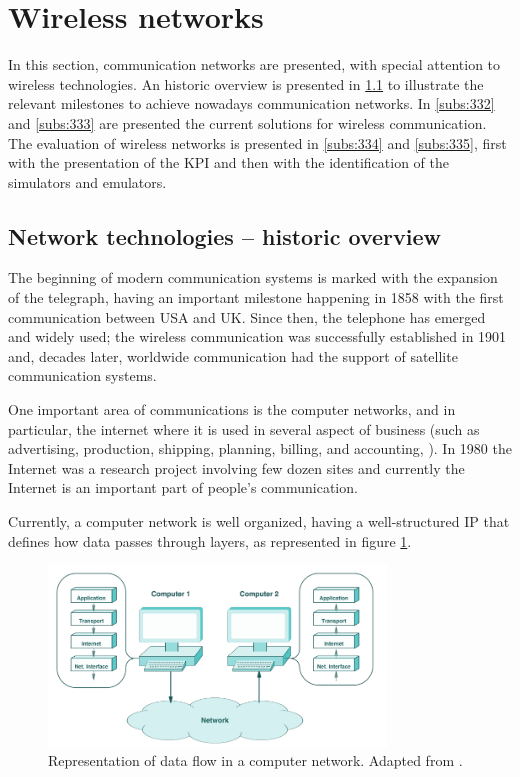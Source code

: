 



\section{Wireless networks}

In this section, communication networks are presented, with special attention to wireless technologies. 
An historic overview is presented in \ref{subs:331} to illustrate the relevant milestones to achieve nowadays communication networks.  
In \ref{subs:332} and \ref{subs:333} are presented the current solutions for wireless communication.
The evaluation of wireless networks is presented in \ref{subs:334} and \ref{subs:335}, first with the presentation of the \ac{KPI} and then with the identification of the simulators and emulators.


\subsection{Network technologies – historic overview}
\label{subs:331}
The beginning of modern communication systems is marked with the expansion of the telegraph, having an important milestone happening in 1858 with the first communication between USA and UK. Since then, the telephone has emerged and widely used; the wireless communication was successfully established in 1901 and, decades later, worldwide communication had the support of satellite communication systems.

One important area of communications is the computer networks, and in particular, the internet where it is used in several aspect of business (such as advertising, production, shipping, planning, billing, and accounting, \cite{comer2008}). In 1980 the Internet was a research project involving few dozen sites and currently the Internet is an important part of people’s communication.

Currently, a computer network is well organized, having a well-structured \ac{IP} that defines how data passes through layers, as represented in figure \ref{fig:comer2008}.

	\begin{figure}[h!]
	\centering
	\includegraphics[width=0.8\textwidth,keepaspectratio]{figures/33.WirelessN/comer2008}
	\caption{Representation of data flow in a computer network. Adapted from \cite{comer2008}.}
	\label{fig:comer2008}
\end{figure}


